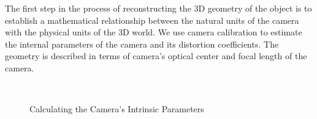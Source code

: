 The first step in the process of reconstructing the 3D geometry of the object
is to establish a mathematical relationship between the natural units of the
camera with the physical units of the 3D world. We use camera calibration to
estimate the internal parameters of the camera and its distortion coefficients.
The geometry is described in terms of camera's optical center and focal
length of the camera.

\begin{figure}[ht!]
\centering
{}\quad
{} \\
\quad
{}
\caption{Calculating the Camera's Intrinsic Parameters}
\label{figure:camera-calibration-intrinsics}
\end{figure}

